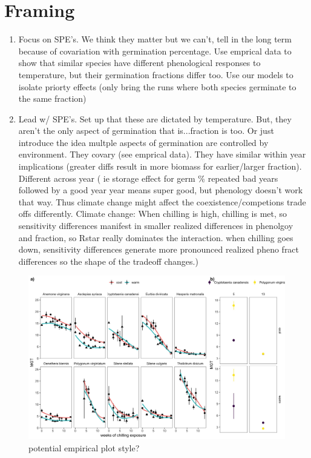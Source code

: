 \documentclass{article}
\begin{document}


\section{Framing}
\begin{enumerate}
\item Focus on SPE's. We think they matter but we can't, tell in the long term because of covariation with germination percentage. Use emprical data to show that similar species have different phenological responses to temperature, but their germination fractions differ too. Use our models to isolate priorty effects (only bring the runs where both species germinate to the same fraction)
\item Lead w/ SPE's. Set up that these are dictated by temperature. But, they aren't the only aspect of germination that is...fraction is too. Or just introduce the idea multple aspects of germination are controlled by environment. They covary (see emprical data). They have similar within year implications (greater diffs result in more biomass for earlier/larger fraction). Different across year ( ie storage effect for germ \% repeated bad years followed by a good year year means super good, but phenology doesn't work that way. Thus climate change might affect the coexistence/competions trade offs differently. Climate change: When chilling is high, chilling is met, so sensitivity differences manifest in smaller realized differences in phenolgoy and fraction, so Rstar really dominates the interaction. when chilling goes down, sensitivity differences generate more pronounced realized pheno fract differences so the shape of the tradeoff changes.)
\end{enumerate}


\begin{figure}[h!]
  \centering
 \includegraphics[width=\textwidth]{..//plots/empricalplots2.jpeg}
    \caption{potential empirical plot style?}
    \label{Fig:emp}
\end{figure}
\end{document}
